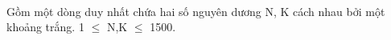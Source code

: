 \\   Gồm một dòng duy nhất chứa hai số nguyên dương N, K cách nhau bởi một khoảng trắng. 1 $\le$ N,K $\le$ 1500.